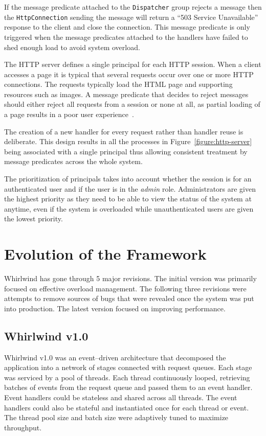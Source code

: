 \documentclass[conference]{IEEEtran}
\begin{document}
If the message predicate attached to the \verb+Dispatcher+ group rejects a message then the \verb+HttpConnection+ sending the message will return a ``503 Service Unavailable'' response to the client and close the connection. This message predicate is only triggered when the message predicates attached to the handlers have failed to shed enough load to avoid system overload.

The HTTP server defines a single principal for each HTTP session. When a client accesses a page it is typical that several requests occur over one or more HTTP connections. The requests typically load the HTML page and supporting resources such as images. A message predicate that decides to reject messages should either reject all requests from a session or none at all, as partial loading of a page results in a poor user experience~\cite{Cherkasova:2002yb}. 

The creation of a new handler for every request rather than handler reuse is deliberate. This design results in all the processes in Figure~\ref{figure:http-server} being  associated with a single principal thus allowing consistent treatment by message predicates across the whole system.

The prioritization of principals takes into account whether the session is for an authenticated user and if the user is in the \emph{admin} role. Administrators are given the highest priority as they need to be able to view the status of the system at anytime, even if the system is overloaded while unauthenticated users are given the lowest priority.

\section{Evolution of the Framework}

Whirlwind has gone through 5 major revisions. The initial version was primarily focused on effective overload management. The following three revisions were attempts to remove sources of bugs that were revealed once the system was put into production. The latest version focused on improving performance.

\subsection{Whirlwind v1.0}

Whirlwind v1.0 was an event--driven architecture that decomposed the application into a network of stages connected with request queues. Each stage was serviced by a pool of threads. Each thread continuously looped, retrieving batches of events from the request queue and passed them to an event handler. Event handlers could be stateless and shared across all threads. The event handlers could also be stateful and instantiated once for each thread or event. The thread pool size and batch size were adaptively tuned to maximize throughput. 
\end{document}
